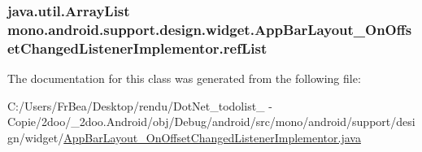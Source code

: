 \hypertarget{classmono_1_1android_1_1support_1_1design_1_1widget_1_1_app_bar_layout___on_offset_changed_listener_implementor_de49459337458d3b2e5ac21d86f11e73}{
\subsubsection[{refList}]{\setlength{\rightskip}{0pt plus 5cm}java.util.ArrayList {\bf mono.android.support.design.widget.AppBarLayout\_\-OnOffsetChangedListenerImplementor.refList}}}
\label{classmono_1_1android_1_1support_1_1design_1_1widget_1_1_app_bar_layout___on_offset_changed_listener_implementor_de49459337458d3b2e5ac21d86f11e73}




The documentation for this class was generated from the following file:\begin{CompactItemize}
\item 
C:/Users/FrBea/Desktop/rendu/DotNet\_\-todolist\_ - Copie/2doo/\_\-2doo.Android/obj/Debug/android/src/mono/android/support/design/widget/\hyperlink{_app_bar_layout___on_offset_changed_listener_implementor_8java}{AppBarLayout\_\-OnOffsetChangedListenerImplementor.java}\end{CompactItemize}
